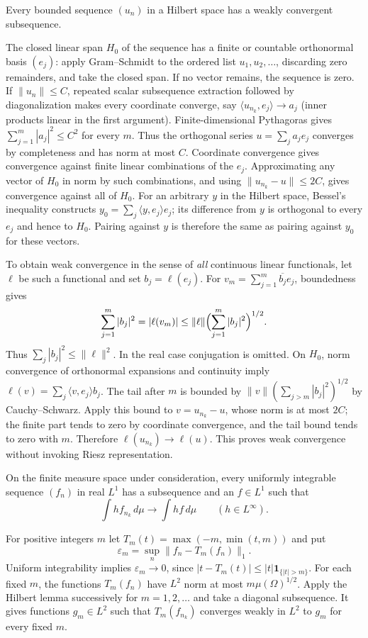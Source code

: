 \begin{lemma}
Every bounded sequence $(u_n)$ in a Hilbert space has a weakly convergent
subsequence.
\end{lemma}
\Proof
The closed linear span $H_0$ of the sequence has a finite or countable
orthonormal basis $(e_j)$: apply Gram--Schmidt to the ordered list
$u_1,u_2,\ldots$, discarding zero remainders, and take the closed span.
If no vector remains, the sequence is zero. If $\|u_n\|\leq C$,
repeated scalar subsequence extraction followed by diagonalization makes
every coordinate converge, say
$\langle u_{n_k},e_j\rangle\to a_j$ (inner products linear in the first
argument). Finite-dimensional Pythagoras gives
$\sum_{j=1}^m|a_j|^2\leq C^2$ for every $m$.
Thus the orthogonal series $u=\sum_j a_je_j$ converges by completeness
and has norm at most $C$. Coordinate convergence gives convergence
against finite linear combinations of the $e_j$. Approximating any
vector of $H_0$ in norm by such combinations, and using
$\|u_{n_k}-u\|\leq2C$, gives convergence against all of $H_0$.
For an arbitrary $y$ in the Hilbert space, Bessel's inequality constructs
$y_0=\sum_j\langle y,e_j\rangle e_j$; its difference from $y$ is
orthogonal to every $e_j$ and hence to $H_0$. Pairing against $y$ is
therefore the same as pairing against $y_0$ for these vectors.

To obtain weak convergence in the sense of \emph{all} continuous linear
functionals, let $\ell$ be such a functional and set $b_j=\ell(e_j)$.
For $v_m=\sum_{j=1}^m\overline{b_j}e_j$, boundedness gives
\[
\sum_{j=1}^m|b_j|^2=|\ell(v_m)|\leq\|\ell\|\Bigl(\sum_{j=1}^m|b_j|^2\Bigr)^{1/2}.
\]
Thus $\sum_j|b_j|^2\leq\|\ell\|^2$. In the real case conjugation is
omitted. On $H_0$, norm convergence of orthonormal expansions and
continuity imply $\ell(v)=\sum_j\langle v,e_j\rangle b_j$.
The tail after $m$ is bounded by
$\|v\|(\sum_{j>m}|b_j|^2)^{1/2}$ by Cauchy--Schwarz.
Apply this bound to $v=u_{n_k}-u$, whose norm is at most $2C$;
the finite part tends to zero by coordinate convergence, and the tail
bound tends to zero with $m$. Therefore $\ell(u_{n_k})\to\ell(u)$.
This proves weak convergence without invoking Riesz representation.
\Done

\begin{theorem}
\label{thm:UI_weak_subsequence}
On the finite measure space under consideration, every uniformly
integrable sequence $(f_n)$ in real $L^1$ has a subsequence and an
$f\in L^1$ such that
\[
\int h f_{n_k}\,d\mu\longrightarrow\int h f\,d\mu
\qquad(h\in L^\infty).
\]
\end{theorem}
\Proof
For positive integers $m$ let $T_m(t)=\max(-m,\min(t,m))$ and put
\[
\varepsilon_m=\sup_n\|f_n-T_m(f_n)\|_1.
\]
Uniform integrability implies $\varepsilon_m\to0$, since
$|t-T_m(t)|\leq |t|\mathbf1_{\{|t|>m\}}$.
For each fixed $m$, the functions $T_m(f_n)$ have $L^2$ norm at most
$m\mu(\Omega)^{1/2}$. Apply the Hilbert lemma successively for
$m=1,2,\ldots$ and take a diagonal subsequence. It gives functions
$g_m\in L^2$ such that $T_m(f_{n_k})$ converges weakly in $L^2$ to
$g_m$ for every fixed $m$.

